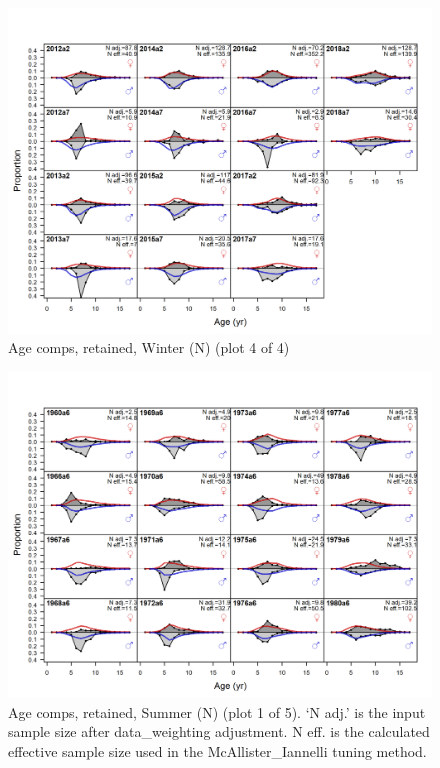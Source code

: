 \documentclass[12pt,]{article}
\begin{document}
\begin{figure}
\centering
\includegraphics{r4ss/plots_mod1/comp_agefit_flt1mkt2_page4.png}
\caption{Age comps, retained, Winter (N) (plot 4 of 4)
\label{fig:age_fits}}
\end{figure}

\begin{figure}
\centering
\includegraphics{r4ss/plots_mod1/comp_agefit_flt2mkt2_page1.png}
\caption{Age comps, retained, Summer (N) (plot 1 of 5). `N adj.' is the
input sample size after data\_weighting adjustment. N eff. is the
calculated effective sample size used in the McAllister\_Iannelli tuning
method. \label{fig:age_fits}}
\end{figure}
\end{document}
